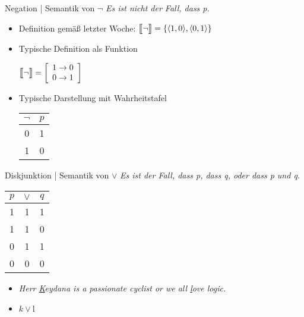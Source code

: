 \begin{frame}
  {Negation | Semantik von $\neg$}
  \onslide<+->
  \onslide<+->
  \textit{Es ist nicht der Fall, dass p.}\\
  \Halbzeile
  \begin{itemize}[<+->]
    \item Definition gemäß letzter Woche: \alert{$\dem{\neg}=\{\tuple{1,0},\tuple{0,1}\}$}
      \Halbzeile
    \item Typische Definition als Funktion\\
      \begin{center}
        $\dem{\neg} = \left[
          \begin{array}{l}
            1 \rightarrow 0\\
            0 \rightarrow 1
         \end{array}
         \right]$
      \end{center}
      \Halbzeile
    \item Typische Darstellung mit \alert{Wahrheitstafel}\\
      \begin{center}
        \begin{tabular}{cc}
          $\neg$ & $p$\\
          \hline
          \alert{0} & 1 \\
          \alert{1} & 0 \\
        \end{tabular}
      \end{center}
  \end{itemize}
\end{frame}

\begin{frame}
  {Diskjunktion | Semantik von $\vee$}
  \onslide<+->
  \onslide<+->
  \textit{Es ist der Fall, dass p, dass q, oder dass p und q.}\\
  \onslide<+->
  \Halbzeile
    \begin{center}
      \begin{tabular}{ccc}
        $p$ & $\vee$ & $q$\\
        \hline
        1 & \alert{1} & 1 \\
        1 & \alert{1} & 0 \\
        0 & \alert{1} & 1 \\
        0 & \alert{0} & 0 \\
      \end{tabular}
    \end{center}
    \Halbzeile
    \begin{itemize}[<+->]
      \item \it{Herr \underline{K}eydana is a passionate cyclist \alert{or} we all \underline{l}ove logic.}
      \item \alert{$k\vee$l}
    \end{itemize}
\end{frame}

